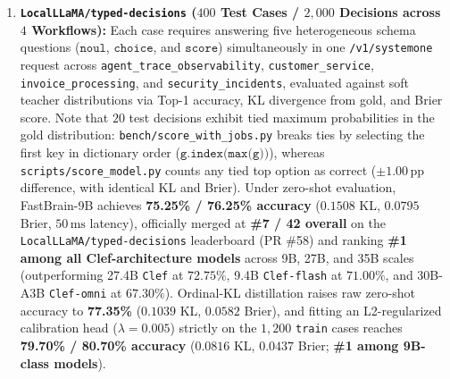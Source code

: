 \documentclass[10pt,twocolumn]{article}
\begin{document}
\begin{enumerate}
    \item \textbf{\texttt{LocalLLaMA/typed-decisions} ($400$ Test Cases / $2{,}000$ Decisions across $4$ Workflows):} Each case requires answering five heterogeneous schema questions ($\texttt{noul}$, $\texttt{choice}$, and $\texttt{score}$) simultaneously in one \texttt{/v1/systemone} request across \texttt{agent\_trace\_observability}, \texttt{customer\_service}, \texttt{invoice\_processing}, and \texttt{security\_incidents}, evaluated against soft teacher distributions via Top-1 accuracy, KL divergence from gold, and Brier score. Note that $20$ test decisions exhibit tied maximum probabilities in the gold distribution: \texttt{bench/score\_with\_jobs.py} breaks ties by selecting the first key in dictionary order ($\texttt{g.index(max(g))}$), whereas \texttt{scripts/score\_model.py} counts any tied top option as correct ($\pm 1.00$\,pp difference, with identical KL and Brier). Under zero-shot evaluation, FastBrain-9B achieves \textbf{75.25\% / 76.25\% accuracy} ($0.1508$ KL, $0.0795$ Brier, $50\,\text{ms}$ latency), officially merged at \textbf{\#7 / 42 overall} on the \texttt{LocalLLaMA/typed-decisions} leaderboard (PR \#58) and ranking \textbf{\#1 among all Clef-architecture models} across 9B, 27B, and 35B scales (outperforming 27.4B \texttt{Clef} at $72.75\%$, 9.4B \texttt{Clef-flash} at $71.00\%$, and 30B-A3B \texttt{Clef-omni} at $67.30\%$). Ordinal-KL distillation raises raw zero-shot accuracy to \textbf{77.35\%} ($0.1039$ KL, $0.0582$ Brier), and fitting an L2-regularized calibration head ($\lambda = 0.005$) strictly on the $1{,}200$ \texttt{train} cases reaches \textbf{79.70\% / 80.70\% accuracy} ($0.0816$ KL, $0.0437$ Brier; \textbf{\#1 among 9B-class models}).
\end{enumerate}
\end{document}
